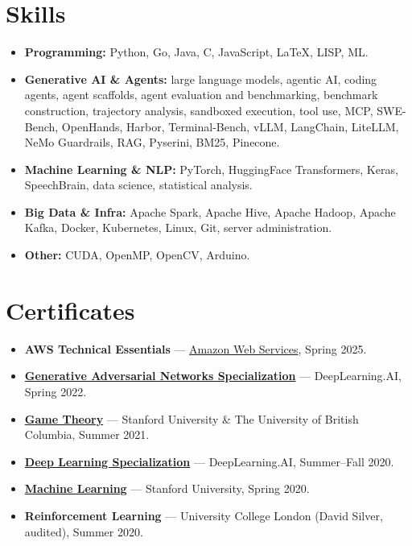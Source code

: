 \documentclass[11pt,letterpaper]{article}
\begin{document}
\section*{Skills}
\begin{itemize}
  \item \textbf{Programming:} Python, Go, Java, C, JavaScript, LaTeX, LISP, ML.
  \item \textbf{Generative AI \& Agents:} large language models, agentic AI, coding agents, agent scaffolds, agent evaluation and benchmarking, benchmark construction, trajectory analysis, sandboxed execution, tool use, MCP, SWE-Bench, OpenHands, Harbor, Terminal-Bench, vLLM, LangChain, LiteLLM, NeMo Guardrails, RAG, Pyserini, BM25, Pinecone.
  \item \textbf{Machine Learning \& NLP:} PyTorch, HuggingFace Transformers, Keras, SpeechBrain, data science, statistical analysis.
  \item \textbf{Big Data \& Infra:} Apache Spark, Apache Hive, Apache Hadoop, Apache Kafka, Docker, Kubernetes, Linux, Git, server administration.
  \item \textbf{Other:} CUDA, OpenMP, OpenCV, Arduino.
\end{itemize}

\section*{Certificates}
\begin{itemize}
  \item \textbf{AWS Technical Essentials} --- \href{https://explore.skillbuilder.aws/learn/courses/1851/aws-technical-essentials}{Amazon Web Services}, Spring 2025.
  \item \textbf{\href{https://www.coursera.org/account/accomplishments/specialization/certificate/WT5VCNDDCB7V}{Generative Adversarial Networks Specialization}} --- DeepLearning.AI, Spring 2022.
  \item \textbf{\href{https://www.coursera.org/account/accomplishments/certificate/ZVWNNHWAJUWC}{Game Theory}} --- Stanford University \& The University of British Columbia, Summer 2021.
  \item \textbf{\href{https://www.coursera.org/account/accomplishments/specialization/certificate/3DWHZC46YSCK}{Deep Learning Specialization}} --- DeepLearning.AI, Summer--Fall 2020.
  \item \textbf{\href{https://www.coursera.org/account/accomplishments/certificate/2XNJSGPREAQY}{Machine Learning}} --- Stanford University, Spring 2020.
  \item \textbf{Reinforcement Learning} --- University College London (David Silver, audited), Summer 2020.
\end{itemize}
\end{document}
